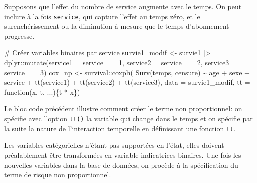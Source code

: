 \documentclass[
  11pt,
  letterpaper,
]{scrbook}
\newenvironment{Shaded}{\begin{snugshade}}{\end{snugshade}}
\newcommand{\AttributeTok}[1]{\textcolor[rgb]{0.40,0.45,0.13}{#1}}
\newcommand{\CommentTok}[1]{\textcolor[rgb]{0.37,0.37,0.37}{#1}}
\newcommand{\ControlFlowTok}[1]{\textcolor[rgb]{0.00,0.23,0.31}{#1}}
\newcommand{\DecValTok}[1]{\textcolor[rgb]{0.68,0.00,0.00}{#1}}
\newcommand{\FunctionTok}[1]{\textcolor[rgb]{0.28,0.35,0.67}{#1}}
\newcommand{\NormalTok}[1]{\textcolor[rgb]{0.00,0.23,0.31}{#1}}
\newcommand{\OtherTok}[1]{\textcolor[rgb]{0.00,0.23,0.31}{#1}}
\newcommand{\SpecialCharTok}[1]{\textcolor[rgb]{0.37,0.37,0.37}{#1}}
\theoremstyle{definition}
\theoremstyle{remark}
\begin{document}
Supposons que l'effet du nombre de service augmente avec le temps. On
peut inclure à la fois \texttt{service}, qui capture l'effet au temps
zéro, et le surenchérissement ou la diminution à mesure que le temps
d'abonnement progresse.

\begin{Shaded}
\begin{Highlighting}[]
\CommentTok{\# Créer variables binaires par service}
\NormalTok{survie1\_modif }\OtherTok{\textless{}{-}}\NormalTok{ survie1 }\SpecialCharTok{|\textgreater{}}
\NormalTok{  dplyr}\SpecialCharTok{::}\FunctionTok{mutate}\NormalTok{(}\AttributeTok{service1 =}\NormalTok{ service }\SpecialCharTok{==} \DecValTok{1}\NormalTok{,}
                \AttributeTok{service2 =}\NormalTok{ service }\SpecialCharTok{==} \DecValTok{2}\NormalTok{,}
                \AttributeTok{service3 =}\NormalTok{ service }\SpecialCharTok{==} \DecValTok{3}\NormalTok{)}
\NormalTok{cox\_np }\OtherTok{\textless{}{-}}\NormalTok{ survival}\SpecialCharTok{::}\FunctionTok{coxph}\NormalTok{(}
    \FunctionTok{Surv}\NormalTok{(temps, censure) }\SpecialCharTok{\textasciitilde{}} 
\NormalTok{     age }\SpecialCharTok{+}\NormalTok{ sexe }\SpecialCharTok{+}\NormalTok{ service }\SpecialCharTok{+} 
      \FunctionTok{tt}\NormalTok{(service1) }\SpecialCharTok{+} \FunctionTok{tt}\NormalTok{(service2) }\SpecialCharTok{+} \FunctionTok{tt}\NormalTok{(service3), }
     \AttributeTok{data =}\NormalTok{ survie1\_modif, }
     \AttributeTok{tt =} \ControlFlowTok{function}\NormalTok{(x, t, ...)\{t }\SpecialCharTok{*}\NormalTok{ x\})}
\end{Highlighting}
\end{Shaded}

Le bloc code précédent illustre comment créer le terme non
proportionnel: on spécifie avec l'option \texttt{tt()} la variable qui
change dans le temps et on spécifie par la suite la nature de
l'interaction temporelle en définissant une fonction \texttt{tt}.

Les variables catégorielles n'étant pas supportées en l'état, elles
doivent préalablement être transformées en variable indicatrices
binaires. Une fois les nouvelles variables dans la base de données, on
procède à la spécification du terme de risque non proportionnel.
\end{document}
